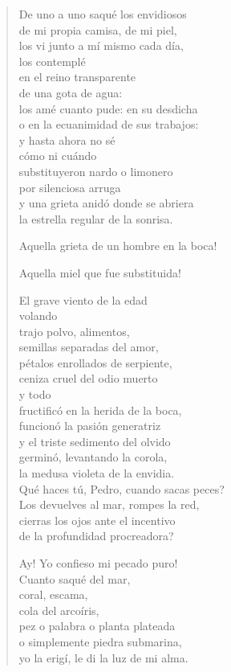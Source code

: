\documentclass[12pt]{article}
\begin{document}
\clearpage
{}
\begin{verse}

De uno a uno saqué los envidiosos\\
de mi propia camisa, de mi piel,\\
los vi junto a mí mismo cada día,\\
los contemplé\\
en el reino transparente\\
de una gota de agua:\\
los amé cuanto pude: en su desdicha\\
o en la ecuanimidad de sus trabajos:\\
y hasta ahora no sé\\
cómo ni cuándo\\
substituyeron nardo o limonero\\
por silenciosa arruga\\
y una grieta anidó donde se abriera\\
la estrella regular de la sonrisa.  

Aquella grieta de un hombre en la boca!  

Aquella miel que fue substituida!  

El grave viento de la edad\\
volando\\
trajo polvo, alimentos,\\
semillas separadas del amor,\\
pétalos enrollados de serpiente,\\
ceniza cruel del odio muerto\\
y todo\\
fructificó en la herida de la boca,\\
funcionó la pasión generatriz\\
y el triste sedimento del olvido\\
germinó, levantando la corola,\\
la medusa violeta de la envidia.\\
Qué haces tú, Pedro, cuando sacas peces?\\
Los devuelves al mar, rompes la red,\\
cierras los ojos ante el incentivo\\
de la profundidad procreadora?  

Ay! Yo confieso mi pecado puro!\\
Cuanto saqué del mar,\\
coral, escama,\\
cola del arcoíris,\\
pez o palabra o planta plateada\\
o simplemente piedra submarina,\\
yo la erigí, le di la luz de mi alma.  


\end{verse}
\end{document}
